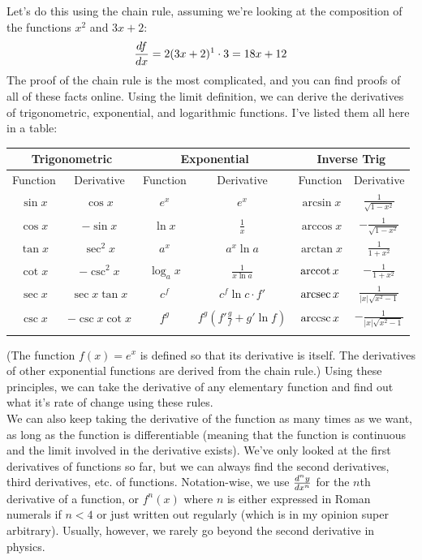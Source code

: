 Let's do this using the chain rule, assuming we're looking at the composition of the functions $x^2$ and $3x+2$:
\[
	\frac{d f}{d x} = 2(3x+2)^{1} \cdot 3 = 18x + 12
\]
The proof of the chain rule is the most complicated, and you can find proofs of all of these facts online. Using the limit definition, we can derive the derivatives of trigonometric, exponential, and logarithmic functions. I've listed them all here in a table:
\begin{center}
	\begin{tabular}{cc|cc|cc}
		\multicolumn{2}{c}{Trigonometric}&\multicolumn{2}{c}{Exponential}&\multicolumn{2}{c}{Inverse Trig}\\ \hline \hline \noalign{\smallskip}
		Function & Derivative & Function & Derivative & Function & Derivative \\ \hline \noalign{\smallskip}
		$\sin x$ & $\cos x$ & $e^x$ & $e^x$ & $\arcsin x$ & $\frac{1}{\sqrt{1-x^2}}$ \\ \hline \noalign{\smallskip}
		$\cos x$ & $-\sin x$ & $\ln x$ & $\frac{1}{x}$ & $\arccos x$ & $-\frac{1}{\sqrt{1-x^2}}$\\ \hline \noalign{\smallskip}
		$\tan x$ & $\sec^2 x$ & $a^x$ & $a^x \ln a$ & $\arctan x$ & $\frac{1}{1+x^2}$\\ \hline \noalign{\smallskip}
		$\cot x$ & $-\csc^2 x$ & $\log_a x$ & $\frac{1}{x \ln a}$ & $\operatorname{arccot} x$ & $-\frac{1}{1+x^2}$ \\ \hline \noalign{\smallskip}
		$\sec x$ & $\sec x \tan x$ & $c^f$ & $c^f \ln c\cdot f'$ & $\operatorname{arcsec} x$ & $\frac{1}{|x|\sqrt{x^2-1}}$ \\ \hline \noalign{\smallskip}
		$\csc x$ & $-\csc x \cot x$ & $f^{g}$ & $f^g \left(f'\frac{g}{f} + g' \ln f \right)$ & $\operatorname{arccsc} x$ & $-\frac{1}{|x|\sqrt{x^2-1}}$ \\ \hline \noalign{\smallskip}
	\end{tabular}
\end{center}
(The function $f(x) = e^x$ is defined so that its derivative is itself. The derivatives of other exponential functions are derived from the chain rule.) Using these principles, we can take the derivative of any elementary function and find out what it's rate of change using these rules.\\
We can also keep taking the derivative of the function as many times as we want, as long as the function is differentiable (meaning that the function is continuous and the limit involved in the derivative exists). We've only looked at the first derivatives of functions so far, but we can always find the second derivatives, third derivatives, etc. of functions. Notation-wise, we use $\frac{d^{n} y}{d x^{n}}$ for the $n$th derivative of a function, or $f^{n}(x)$ where $n$ is either expressed in Roman numerals if $n < 4$ or just written out regularly (which is in my opinion super arbitrary). Usually, however, we rarely go beyond the second derivative in physics. 

